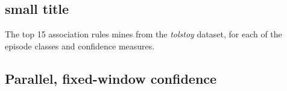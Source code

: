 \appendix

\begin{appendices}


\chapter{%
small title%
}

The top 15 association rules mines from the \emph{tolstoy} dataset, for each of the episode classes and confidence measures.

\section{Parallel, fixed-window confidence}


\end{appendices}
